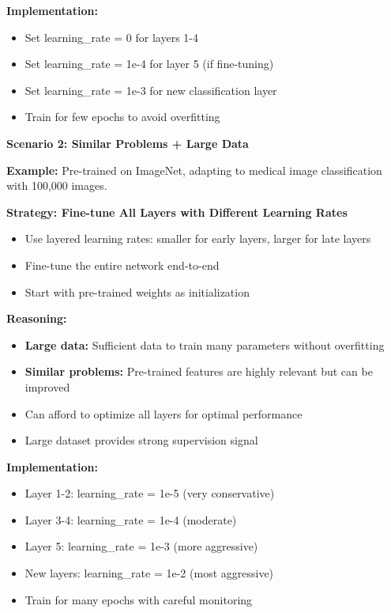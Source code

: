 \documentclass[12pt]{article}
\newcommand{\explanation}[1]{{\color{explanationcolor}#1}}
\begin{document}
\begin{enumerate}[(a)]
{{    \textbf{Implementation:}
    \begin{itemize}
        \item Set learning\_rate = 0 for layers 1-4
        \item Set learning\_rate = 1e-4 for layer 5 (if fine-tuning)
        \item Set learning\_rate = 1e-3 for new classification layer
        \item Train for few epochs to avoid overfitting
    \end{itemize}
    }
    
    \textbf{Scenario 2: Similar Problems + Large Data}
    
    \explanation{
    \textbf{Example:} Pre-trained on ImageNet, adapting to medical image classification with 100,000 images.
    
    \textbf{Strategy: Fine-tune All Layers with Different Learning Rates}
    \begin{itemize}
        \item Use layered learning rates: smaller for early layers, larger for late layers
        \item Fine-tune the entire network end-to-end
        \item Start with pre-trained weights as initialization
    \end{itemize}
    
    \textbf{Reasoning:}
    \begin{itemize}
        \item \textbf{Large data:} Sufficient data to train many parameters without overfitting
        \item \textbf{Similar problems:} Pre-trained features are highly relevant but can be improved
        \item Can afford to optimize all layers for optimal performance
        \item Large dataset provides strong supervision signal
    \end{itemize}
    
    \textbf{Implementation:}
    \begin{itemize}
        \item Layer 1-2: learning\_rate = 1e-5 (very conservative)
        \item Layer 3-4: learning\_rate = 1e-4 (moderate)
        \item Layer 5: learning\_rate = 1e-3 (more aggressive)
        \item New layers: learning\_rate = 1e-2 (most aggressive)
        \item Train for many epochs with careful monitoring
    \end{itemize}
    }
    
}
\end{enumerate}
\end{document}
